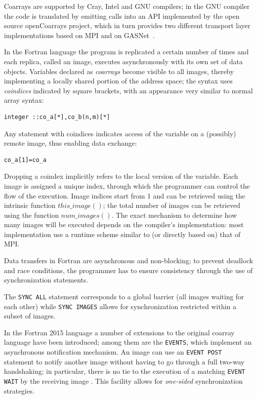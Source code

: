 \documentclass{IOS-Book-Article}
\begin{document}
Coarrays are supported by Cray, Intel and  GNU 
compilers; in the GNU compiler the code is translated by emitting
calls into an API  implemented by the open source openCoarrays
project, which in turn provides two different transport
layer implementations  based on MPI and on GASNet~\cite{PGAS14}.  

In the Fortran language the program is replicated a certain number of
times and each replica, called an image, executes asynchronously
with its own set of data objects.  
 Variables  declared as \emph{coarrays} become visible to all images,
 thereby implementing a locally shared portion of the address space;
 the syntax uses \emph{coindices} indicated by square brackets, with
 an appearance very similar to normal array syntax:
\begin{lstlisting}
integer ::co_a[*],co_b(n,m)[*]
\end{lstlisting}
Any statement with coindices indicates access of the variable on a
(possibly) remote image, thus enabling data exchange:
\begin{lstlisting}
co_a[1]=co_a
\end{lstlisting}
Dropping a coindex implicitly refers to the local version of the
variable. 
Each image is assigned a unique index, through which the programmer
can control the flow of the execution. Image indices start from 1 and
can be retrieved using the intrinsic function $this\_image()$;  the
total number of images can be retrieved using the function
$num\_images()$. %
The exact mechanism to determine how many images will be executed
depends on the compiler's implementation: most implementation use a
runtime scheme similar to (or directly based on) that of MPI. 

Data transfers in Fortran are asynchronous and non-blocking;
to prevent  deadlock and race conditions, the programmer has to ensure
consistency through the use of synchronization statements.

The \verb|SYNC ALL| statement corresponds to a global barrier (all
images waiting for each other) while \verb|SYNC IMAGES| allows for
 synchronization restricted within a subset of images.

In the Fortran 2015 language a number of extensions to the original
coarray language have been introduced; among them are the
\verb|EVENTS|, which implement an asynchronous notification
mechanism. 
An image can use an \verb|EVENT POST| statement to notify another
image without having to go through a full two-way handshaking; in
particular, there is no tie to the 
execution of a matching \verb|EVENT WAIT| by the receiving image .
This facility allows for \emph{one-sided} synchronization
strategies.   
\end{document}
